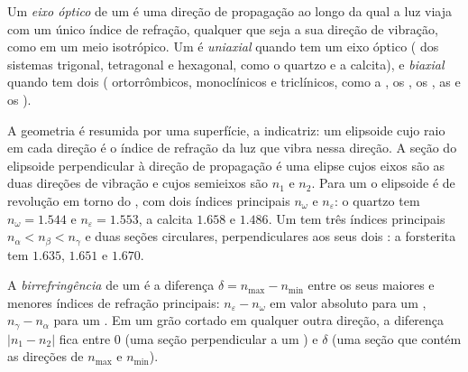 \begin{definition}\label{def:b1:optical-mineralogy:optic-axis}
Um \emph{eixo óptico} de um  é uma direção de propagação ao longo da qual a luz viaja com um único índice de refração, qualquer que seja a sua direção de vibração, como em um meio isotrópico. Um  é \emph{uniaxial} quando tem um eixo óptico ( dos sistemas trigonal, tetragonal e hexagonal, como o quartzo e a calcita), e \emph{biaxial} quando tem dois ( ortorrômbicos, monoclínicos e triclínicos, como a , os , os , as  e os ).
\end{definition}

A geometria é resumida por uma superfície, a indicatriz: um elipsoide cujo raio em cada direção é o índice de refração da luz que vibra nessa direção. A seção do elipsoide perpendicular à direção de propagação é uma elipse cujos eixos são as duas direções de vibração e cujos semieixos são $n_1$ e $n_2$. Para um   o elipsoide é de revolução em torno do , com dois índices principais $n_\omega$ e $n_\varepsilon$: o quartzo tem $n_\omega = 1.544$ e $n_\varepsilon = 1.553$, a calcita $1.658$ e $1.486$.
Um   tem três índices principais $n_\alpha < n_\beta < n_\gamma$ e duas seções circulares, perpendiculares aos seus dois : a forsterita tem $1.635$, $1.651$ e $1.670$.

\begin{definition}\label{def:b1:optical-mineralogy:birefringence}
A \emph{birrefringência} de um  é a diferença $\delta = n_{\max} - n_{\min}$ entre os seus maiores e menores índices de refração principais: $n_\varepsilon - n_\omega$ em valor absoluto para um  , $n_\gamma - n_\alpha$ para um . Em um grão cortado em qualquer outra direção, a diferença $|n_1 - n_2|$ fica entre 0 (uma seção perpendicular a um ) e $\delta$ (uma seção que contém as direções de $n_{\max}$ e $n_{\min}$).
\end{definition}

